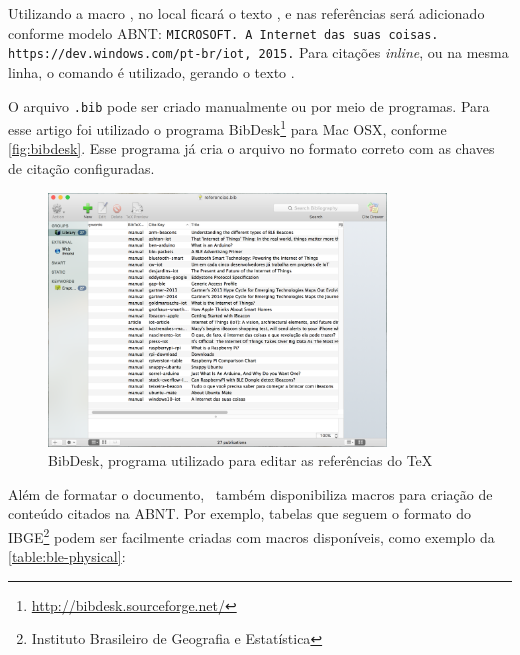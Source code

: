 \documentclass[
		12pt,				%
		openright,			%
		oneside,			%
		a4paper,			%
		chapter=TITLE,		%
		english,			%
		brazil				%
	]{abntex2}
\begin{document}
\begin{apendicesenv}
Utilizando a macro \texttt{}, no local ficará o texto \cite{windows10-iot}, e nas referências será adicionado conforme modelo ABNT: \texttt{MICROSOFT. A Internet das suas coisas. https://dev.windows.com/pt-br/iot, 2015.} Para citações \textit{inline}, ou na mesma linha, o comando \texttt{} é utilizado, gerando o texto .

O arquivo \texttt{.bib} pode ser criado manualmente ou por meio de programas. Para esse artigo foi utilizado o programa BibDesk\footnote{\url{http://bibdesk.sourceforge.net/}} para Mac OSX, conforme \autoref{fig:bibdesk}. Esse programa já cria o arquivo no formato correto com as chaves de citação configuradas.

\begin{figure}[htb]
	\caption{\label{fig:bibdesk}BibDesk, programa utilizado para editar as referências do TeX}
	\begin{center}
		\includegraphics[width=0.8\textwidth]{img/bibdesk.png}
	\end{center}
\end{figure}

Além de formatar o documento, \abnTeX\ também disponibiliza macros para criação de conteúdo citados na ABNT. Por exemplo, tabelas que seguem o formato do IBGE\footnote{Instituto Brasileiro de Geografia e Estatística} podem ser facilmente criadas com macros disponíveis, como exemplo da \autoref{table:ble-physical}:


\end{apendicesenv}
\end{document}
